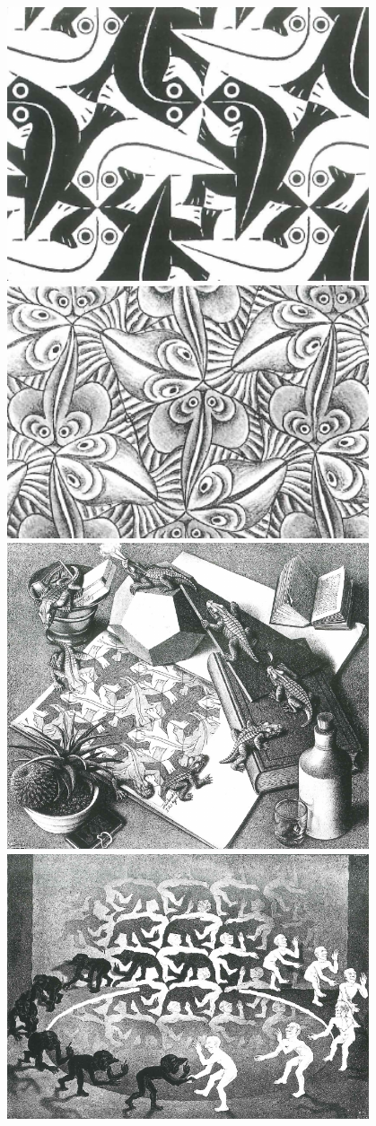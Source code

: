 \documentclass[a4paper]{report}
\theoremstyle{definition}
\begin{document}
\begin{center}
    \includegraphics[width=0.8\textwidth]{escher4}
    \includegraphics[width=0.8\textwidth]{escher5}
    \includegraphics[width=0.8\textwidth]{escher6}
    \includegraphics[width=0.8\textwidth]{escher7}

\end{center}
\end{document}
